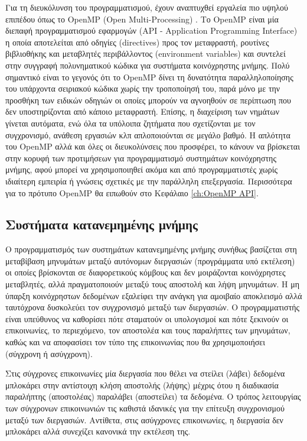 Για τη διευκόλυνση του προγραμματισμού, έχουν αναπτυχθεί εργαλεία πιο υψηλού επιπέδου όπως το OpenMP (Open Multi-Processing) \cite{dagum1998openmp}. Το OpenMP είναι μία διεπαφή προγραμματισμού εφαρμογών (API - Application Programming Interface) η οποία αποτελείται από οδηγίες (directives) προς τον μεταφραστή, ρουτίνες βιβλιοθήκης και μεταβλητές περιβάλλοντος (environment variables) και συντελεί στην συγγραφή πολυνηματικού κώδικα για συστήματα κοινόχρηστης μνήμης. Πολύ σημαντικό είναι το γεγονός ότι το OpenMP δίνει τη δυνατότητα παραλληλοποίησης του υπάρχοντα σειριακού κώδικα χωρίς την τροποποίησή του, παρά μόνο με την προσθήκη των ειδικών οδηγιών οι οποίες μπορούν να αγνοηθούν σε περίπτωση που δεν υποστηρίζονται από κάποιο μεταφραστή. Επίσης, η διαχείριση των νημάτων γίνεται αυτόματα, ενώ όλα τα υπόλοιπα ζητήματα που σχετίζονται με τον συγχρονισμό, ανάθεση εργασιών κλπ απλοποιούνται σε μεγάλο βαθμό. Η απλότητα του OpenMP αλλά και όλες οι διευκολύνσεις που προσφέρει, το κάνουν να βρίσκεται στην κορυφή των προτιμήσεων για προγραμματισμό συστημάτων κοινόχρηστης μνήμης, αφού μπορεί να χρησιμοποιηθεί ακόμα και από προγραμματιστές χωρίς ιδιαίτερη εμπειρία ή γνώσεις σχετικές με την παράλληλη επεξεργασία. Περισσότερα για το πρότυπο OpenMP θα ειπωθούν στο Κεφάλαιο \ref{ch:OpenMP API}.


\subsection{Συστήματα κατανεμημένης μνήμης}
Ο προγραμματισμός των συστημάτων κατανεμημένης μνήμης συνήθως βασίζεται στη μεταβίβαση μηνυμάτων μεταξύ αυτόνομων διεργασιών (προγράμματα υπό εκτέλεση) οι οποίες βρίσκονται σε διαφορετικούς κόμβους και δεν μοιράζονται κοινόχρηστες μεταβλητές, αλλά πραγματοποιούν μεταξύ τους αποστολή και λήψη μηνυμάτων. Η μη ύπαρξη κοινόχρηστων δεδομένων εξαλείφει την ανάγκη για αμοιβαίο αποκλεισμό αλλά ταυτόχρονα δυσκολεύει τον συγχρονισμό μεταξύ των διεργασιών. Ο προγραμματιστής είναι υπεύθυνος να καθορίσει πότε σταματούν οι υπολογισμοί και πότε ξεκινούν οι επικοινωνίες, το περιεχόμενο, τον αποστολέα και τους παραλήπτες των μηνυμάτων, καθώς και να αποφασίσει τον τύπο της επικοινωνίας που θα χρησιμοποιήσει (σύγχρονη ή ασύγχρονη).

Στις σύγχρονες επικοινωνίες μία διεργασία που θέλει να στείλει (λάβει) δεδομένα μπλοκάρει στην αντίστοιχη κλήση αποστολής (λήψης) μέχρις ότου η διαδικασία παραλήπτης (αποστολέας) παραλάβει (αποστείλει) τα δεδομένα. Ο τρόπος λειτουργίας των σύγχρονων επικοινωνιών τις καθιστά ιδανικές για την επίτευξη συγχρονισμού μεταξύ των διεργασιών. Αντίθετα, στις ασύγχρονες επικοινωνίες, η διεργασία δεν μπλοκάρει αλλά συνεχίζει κανονικά την εκτέλεση της.

